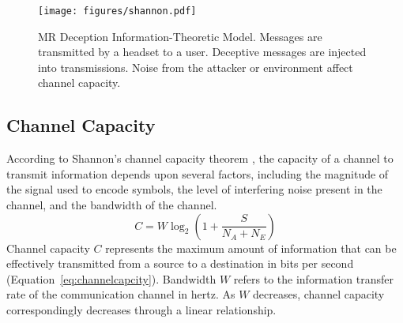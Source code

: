 


\begin{figure}[ht!]
    \centering
    \texttt{[image: figures/shannon.pdf]}
    \caption{MR Deception Information-Theoretic Model. Messages are transmitted by a \MR headset to a user. Deceptive messages are injected into transmissions. Noise from the attacker or environment affect channel capacity.}
    \label{fig:mr-communication-model}
    \vspace{-1ex}
\end{figure}

\subsection{Channel Capacity}
According to Shannon's channel capacity theorem \cite{shannon1948mathematical}, the capacity of a channel to transmit information depends upon several factors, including the magnitude of the signal used to encode symbols, the level of interfering noise present in the channel, and the bandwidth of the channel.
\begin{equation} \label{eq:channelcapcity}
    C = W \log_2\left(1 + \frac{S}{N_A + N_E}\right)
\end{equation}
Channel capacity \({C}\) represents the maximum amount of information that can be effectively transmitted from a source to a destination in bits per second (Equation~\ref{eq:channelcapcity}).  Bandwidth \({W}\) refers to the information transfer rate of the communication channel in hertz. As $W$ decreases, channel capacity correspondingly decreases through a linear relationship.

